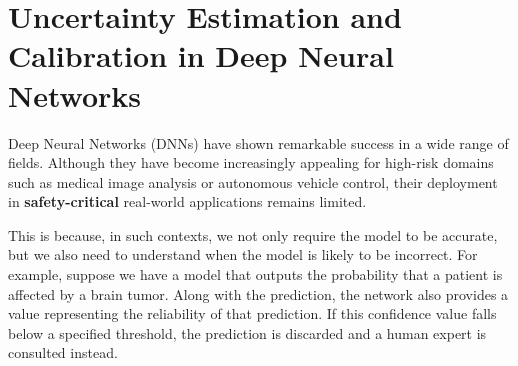 \chapter{Uncertainty Estimation and Calibration in Deep Neural Networks}

Deep Neural Networks (DNNs) have shown remarkable success in a wide range of fields. 
Although they have become increasingly appealing for high-risk domains such as medical image analysis 
or autonomous vehicle control, their deployment in \textbf{safety-critical} real-world applications 
remains limited.

This is because, in such contexts, we not only require the model to be accurate, but we also need to 
understand when the model is likely to be incorrect. For example, suppose we have a model that outputs 
the probability that a patient is affected by a brain tumor. Along with the prediction, the network 
also provides a value representing the reliability of that prediction. If this confidence value falls 
below a specified threshold, the prediction is discarded and a human expert is consulted instead.

